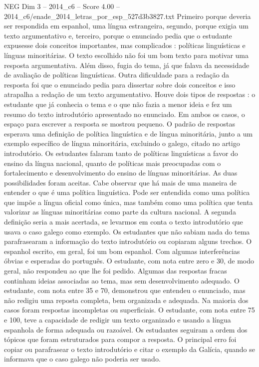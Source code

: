 \begin{textsample}{NEG Dim 3 – 2014\_c6 – Score 4.00 – 2014\_c6/enade\_2014\_letras\_por\_esp\_527d3b3827.txt}
Primeiro porque deveria ser respondida em espanhol, uma língua estrangeira, segundo, porque exigia um texto argumentativo e, terceiro, porque o enunciado pedia que o estudante expusesse dois conceitos importantes, mas complicados : políticas linguísticas e línguas minoritárias.
O texto escolhido não foi um bom texto para motivar uma resposta argumentativa.
Além disso, fugia do tema, já que falava da necessidade de avaliação de políticas linguísticas.
Outra dificuldade para a redação da resposta foi que o enunciado pedia para dissertar sobre dois conceitos e isso atrapalha a redação de um texto argumentativo.
Houve dois tipos de respostas : o estudante que já conhecia o tema e o que não fazia a menor ideia e fez um resumo do texto introdutório apresentado no enunciado.
Em ambos os casos, o espaço para escrever a resposta se mostrou pequeno.
O padrão de respostas esperava uma definição de política linguística e de língua minoritária, junto a um exemplo específico de língua minoritária, excluindo o galego, citado no artigo introdutório.
Os estudantes falaram tanto de políticas linguísticas a favor do ensino da língua nacional, quanto de políticas mais preocupadas com o fortalecimento e desenvolvimento do ensino de línguas minoritárias.
As duas possibilidades foram aceitas.
Cabe observar que há mais de uma maneira de entender o que é uma política linguística.
Pode ser entendida como uma política que impõe a língua oficial como única, mas também como uma política que tenta valorizar as línguas minoritárias como parte da cultura nacional.
A segunda definição seria a mais acertada, se levarmos em conta o texto introdutório que usava o caso galego como exemplo.
Os estudantes que não sabiam nada do tema parafrasearam a informação do texto introdutório ou copiaram alguns trechos.
O espanhol escrito, em geral, foi um bom espanhol.
Com algumas interferências óbvias e esperadas do português.
O estudante, com nota entre zero e 30, de modo geral, não respondeu ao que lhe foi pedido.
Algumas das respostas fracas continham ideias associadas ao tema, mas sem desenvolvimento adequado.
O estudante, com nota entre 35 e 70, demonstrou que entendeu o enunciado, mas não redigiu uma reposta completa, bem organizada e adequada.
Na maioria dos casos foram respostas incompletas ou superficiais.
O estudante, com nota entre 75 e 100, teve a capacidade de redigir um texto organizado e usando a língua espanhola de forma adequada ou razoável.
Os estudantes seguiram a ordem dos tópicos que foram estruturados para compor a resposta.
O principal erro foi copiar ou parafrasear o texto introdutório e citar o exemplo da Galícia, quando se informava que o caso galego não poderia ser usado.

\end{textsample}
